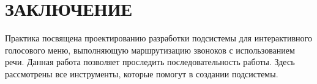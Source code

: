 \chapter{ЗАКЛЮЧЕНИЕ}

Практика посвящена проектированию разработки подсистемы для интерактивного
голосового меню, выполняющую маршрутизацию звоноков с использованием речи.
Данная работа позволяет проследить последовательность работы.
Здесь рассмотрены все инструменты, которые помогут в создании подсистемы.
